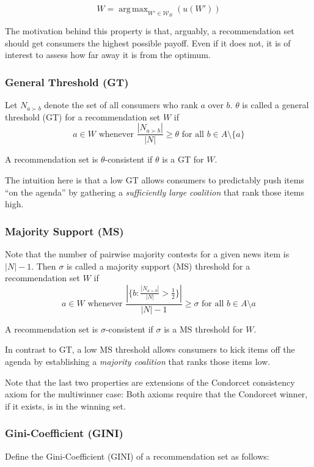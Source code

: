 \documentclass{article}
\DeclareMathOperator*{\argmax}{arg\,max}
\begin{document}
\[
W=\argmax_{W'\in \mathcal{W}_B}(u(W'))
\]

The motivation behind this property is that, arguably, a recommendation set should get consumers the highest possible payoff. Even if it does not, it is of interest to assess how far away it is from the optimum.

\subsubsection{General Threshold (GT)}

Let $N_{a\succ b}$ denote the set of all consumers who rank $a$ over $b$. $\theta$ is called a general threshold (GT) for a recommendation set $W$ if \[a\in W\text{ whenever }\frac {|N_{a\succ b}|}{|N|}\geq \theta \text{ for all } b\in A\setminus \{a\} \]

A recommendation set is $\theta$-consistent if $\theta$ is a GT for $W$.

The intuition here is that a low GT allows consumers to predictably push items ``on the agenda'' by gathering a \emph{sufficiently large coalition} that rank those items high.

\subsubsection{Majority Support (MS)}

Note that the number of pairwise majority contests for a given news item is $|N|-1$. Then $\sigma$ is called a majority support (MS) threshold for a recommendation set $W$ if \[a\in W \text{ whenever }\frac {|\{b:\frac{|N_{a\succ b}|}{|N|}>\frac{1}{2}\}|}{|N|-1}\geq \sigma \text{ for all } b\in A\setminus{a}\]

A recommendation set is $\sigma$-consistent if $\sigma$ is a MS threshold for $W$.

In contrast to GT, a low MS threshold allows consumers to kick items off the agenda by establishing a \emph {majority coalition} that ranks those items low.

Note that the last two properties are extensions of the Condorcet consistency axiom for the multiwinner case: Both axioms require that the Condorcet winner, if it exists, is in the winning set.

\subsubsection{Gini-Coefficient (GINI)}

Define the Gini-Coefficient (GINI) of a recommendation set as follows:
\end{document}
